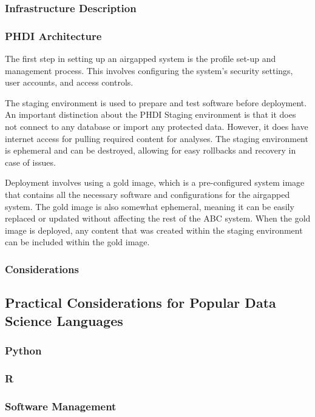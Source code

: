 \documentclass{amia}
\begin{document}
\subsubsection{Infrastructure Description}
\subsubsection*{PHDI Architecture}

The first step in setting up an airgapped system is the profile set-up and management process. This involves configuring the system's security settings, user accounts, and access controls.  

The staging environment is used to prepare and test software before deployment. An important distinction about the PHDI Staging environment is that it does not connect to any database or import any protected data. However, it does have internet access for pulling required content for analyses. The staging environment is ephemeral and can be destroyed, allowing for easy rollbacks and recovery in case of issues. 

Deployment involves using a gold image, which is a pre-configured system image that contains all the necessary software and configurations for the airgapped system. The gold image is also somewhat ephemeral, meaning it can be easily replaced or updated without affecting the rest of the ABC system. When the gold image is deployed, any content that was created within the staging environment can be included within the gold image. 

\subsubsection{Considerations}

\subsection*{Practical Considerations for Popular Data Science Languages}

\subsubsection*{Python}

\subsubsection*{R}

\subsubsection*{Software Management}
\end{document}
